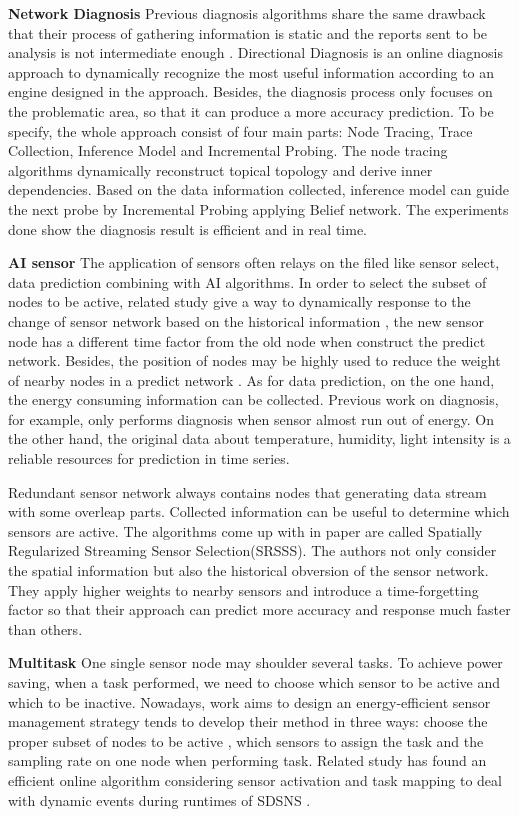 \textbf{Network Diagnosis}
Previous diagnosis algorithms share the same drawback that their process of gathering information is static and the reports sent to be analysis is not intermediate enough \cite{Ramanathan2005Sympathy,Khan2010Diagnostic}. Directional Diagnosis \cite{gong2015directional} is an online diagnosis approach to dynamically recognize the most useful information according to an engine designed in the approach. Besides, the diagnosis process only focuses on the problematic area, so that it can produce a more accuracy prediction. To be specify, the whole approach consist of four main parts: Node Tracing, Trace Collection, Inference Model and Incremental Probing. The node tracing algorithms dynamically reconstruct topical topology and derive inner dependencies. Based on the data information collected, inference model can guide the next probe by Incremental Probing applying Belief network. The experiments done show the diagnosis result is efficient and in real time.

\textbf{AI sensor}
The application of sensors often relays on the filed like sensor select, data prediction combining with AI algorithms. In order to select the subset of nodes to be active, related study give a way to dynamically response to the change of sensor network based on the historical information \cite{Mo2013Dynamic}, the new sensor node has a different time factor from the old node when construct the predict network. Besides, the position of nodes may be highly used to reduce the weight of nearby nodes in a predict network \cite{Kumar2017Edge}. As for data prediction, on the one hand, the energy consuming information can be collected. Previous work on diagnosis, for example, only performs diagnosis when sensor almost run out of energy. On the other hand, the original data about temperature, humidity, light intensity is a reliable resources for prediction in time series\cite{Raza2014Practical}. 

Redundant sensor network always contains nodes that generating data stream with some overleap parts. Collected information can be useful to determine which sensors are active. The algorithms come up with in paper\cite{li2016spatially} are called Spatially Regularized Streaming Sensor Selection(SRSSS). The authors not only consider the spatial information but also the historical obversion of the sensor network. They apply higher weights to nearby sensors and introduce a time-forgetting factor so that their approach can predict more accuracy and response much faster than others.
	
\textbf{Multitask}
One single sensor node may shoulder several tasks. To achieve power saving, when a task performed, we need to choose which sensor to be active and which to be inactive. Nowadays, work aims to design an energy-efficient sensor management strategy tends to develop their method in three ways: choose the proper subset of nodes to be active \cite{Aghdasi2009High}, which sensors to assign the task and the sampling rate on one node when performing task. Related study has found an efficient online algorithm considering sensor activation and task mapping to deal with dynamic events during runtimes of SDSNS \cite{Zeng2015}.
